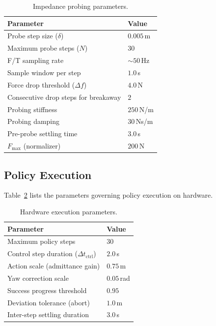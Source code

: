 \begin{table}[h]
\centering
\caption{Impedance probing parameters.}
\label{tab:probe_params}
\begin{tabular}{ll}
\toprule
\textbf{Parameter}                     & \textbf{Value}         \\
\midrule
Probe step size ($\delta$)             & $0.005$\,m             \\
Maximum probe steps ($N$)              & $30$                   \\
F/T sampling rate                      & $\sim\!50$\,Hz         \\
Sample window per step                 & $1.0$\,s               \\
Force drop threshold ($\Delta f$)      & $4.0$\,N               \\
Consecutive drop steps for breakaway   & $2$                    \\
Probing stiffness                      & $250$\,N/m             \\
Probing damping                        & $30$\,Ns/m             \\
Pre-probe settling time                & $3.0$\,s               \\
$F_{\max}$ (normalizer)               & $200$\,N               \\
\bottomrule
\end{tabular}
\end{table}

\subsection{Policy Execution}

Table~\ref{tab:exec_params} lists the parameters governing policy execution on hardware.

\begin{table}[h]
\centering
\caption{Hardware execution parameters.}
\label{tab:exec_params}
\begin{tabular}{ll}
\toprule
\textbf{Parameter}                  & \textbf{Value}         \\
\midrule
Maximum policy steps                & $30$                   \\
Control step duration ($\Delta t_{\mathrm{ctrl}}$) & $2.0$\,s \\
Action scale (admittance gain)      & $0.75$\,m              \\
Yaw correction scale                & $0.05$\,rad            \\
Success progress threshold          & $0.95$                 \\
Deviation tolerance (abort)         & $1.0$\,m               \\
Inter-step settling duration        & $3.0$\,s               \\
\bottomrule
\end{tabular}
\end{table}

